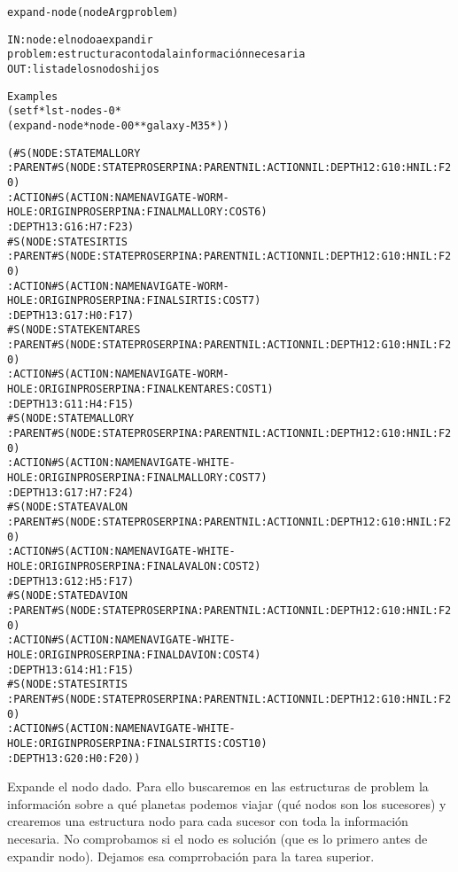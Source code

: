 \begin{aibox}{\function}
\begin{alltt}
expand-node (nodeArg problem)


IN:     node: el nodo a expandir
       problem: estructura con toda la información necesaria
OUT: lista de los nodos hijos

\end{alltt}
\end{aibox}

\begin{aibox}{\examples}
\begin{alltt}
Examples
(setf *lst-nodes-0*
    (expand-node *node-00* *galaxy-M35*))

(\#S(NODE :STATE MALLORY
 :PARENT  \#S(NODE :STATE PROSERPINA :PARENT NIL :ACTION NIL :DEPTH 12 :G 10 :H NIL :F 20)
 :ACTION  \#S(ACTION :NAME NAVIGATE-WORM-HOLE :ORIGIN PROSERPINA :FINAL MALLORY :COST 6)
 :DEPTH 13 :G 16 :H 7 :F 23)
\#S(NODE :STATE SIRTIS
 :PARENT  \#S(NODE :STATE PROSERPINA :PARENT NIL :ACTION NIL :DEPTH 12 :G 10 :H NIL :F 20)
 :ACTION  \#S(ACTION :NAME NAVIGATE-WORM-HOLE :ORIGIN PROSERPINA :FINAL SIRTIS :COST 7)
 :DEPTH 13 :G 17 :H 0 :F 17)
\#S(NODE :STATE KENTARES
 :PARENT  \#S(NODE :STATE PROSERPINA :PARENT NIL :ACTION NIL :DEPTH 12 :G 10 :H NIL :F 20)
 :ACTION  \#S(ACTION :NAME NAVIGATE-WORM-HOLE :ORIGIN PROSERPINA :FINAL KENTARES :COST 1)
 :DEPTH 13 :G 11 :H 4 :F 15)
\#S(NODE :STATE MALLORY
 :PARENT  \#S(NODE :STATE PROSERPINA :PARENT NIL :ACTION NIL :DEPTH 12 :G 10 :H NIL :F 20)
 :ACTION  \#S(ACTION :NAME NAVIGATE-WHITE-HOLE :ORIGIN PROSERPINA :FINAL MALLORY :COST 7)
 :DEPTH 13 :G 17 :H 7 :F 24)
\#S(NODE :STATE AVALON
 :PARENT  \#S(NODE :STATE PROSERPINA :PARENT NIL :ACTION NIL :DEPTH 12 :G 10 :H NIL :F 20)
 :ACTION  \#S(ACTION :NAME NAVIGATE-WHITE-HOLE :ORIGIN PROSERPINA :FINAL AVALON :COST 2)
 :DEPTH 13 :G 12 :H 5 :F 17)
\#S(NODE :STATE DAVION
 :PARENT  \#S(NODE :STATE PROSERPINA :PARENT NIL :ACTION NIL :DEPTH 12 :G 10 :H NIL :F 20)
 :ACTION  \#S(ACTION :NAME NAVIGATE-WHITE-HOLE :ORIGIN PROSERPINA :FINAL DAVION :COST 4)
 :DEPTH 13 :G 14 :H 1 :F 15)
\#S(NODE :STATE SIRTIS
 :PARENT  \#S(NODE :STATE PROSERPINA :PARENT NIL :ACTION NIL :DEPTH 12 :G 10 :H NIL :F 20)
 :ACTION  \#S(ACTION :NAME NAVIGATE-WHITE-HOLE :ORIGIN PROSERPINA :FINAL SIRTIS :COST 10)
 :DEPTH 13 :G 20 :H 0 :F 20))



\end{alltt}
\end{aibox}

\begin{aibox}{\comments}
Expande el nodo dado. Para ello buscaremos en las estructuras de problem 
la información sobre a qué planetas podemos viajar (qué nodos son los sucesores) 
y crearemos una estructura nodo para cada sucesor con toda la información necesaria.  No comprobamos si el nodo es solución (que es lo primero antes de expandir nodo).
Dejamos esa comprrobación para la tarea superior.

\end{aibox}

